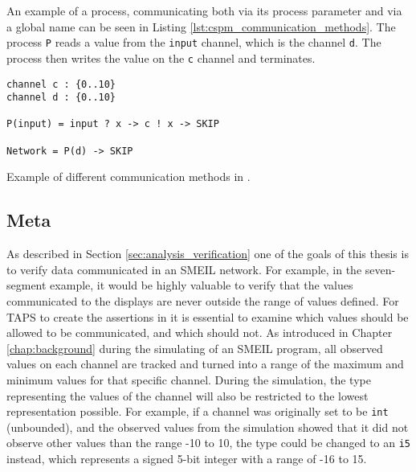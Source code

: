 An example of a \cspm{} process, communicating both via its process parameter and via a global name can be seen in Listing \ref{lst:cspm_communication_methods}. The process \texttt{P} reads a value from the \texttt{input} channel, which is the channel \texttt{d}. The process then writes the value on the \texttt{c} channel and terminates.
\begin{listing}
\begin{verbatim}
channel c : {0..10}
channel d : {0..10}

P(input) = input ? x -> c ! x -> SKIP

Network = P(d) -> SKIP
\end{verbatim}
\caption{Example of different communication methods in \cspm{}.}
\label{lst:cspm_communication_methods}
\end{listing}
\subsection{Meta}
As described in Section \ref{sec:analysis_verification} one of the goals of this thesis is to verify data communicated in an SMEIL network. For example, in the seven-segment example, it would be highly valuable to verify that the values communicated to the displays are never outside the range of values defined. For TAPS to create the assertions in \cspm{} it is essential to examine which values should be allowed to be communicated, and which should not.
As introduced in Chapter \ref{chap:background} during the simulating of an SMEIL program, all observed values on each channel are tracked and turned into a range of the maximum and minimum values for that specific channel. During the simulation, the type representing the values of the channel will also be restricted to the lowest representation possible. For example, if a channel was originally set to be \texttt{int} (unbounded), and the observed values from the simulation showed that it did not observe other values than the range -10 to 10, the type could be changed to an \texttt{i5} instead, which represents a signed 5-bit integer with a range of -16 to 15.

